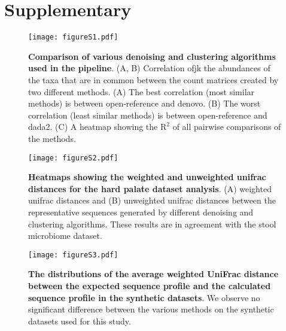 
\newpage
\section*{Supplementary}

  

  \renewcommand{\thefigure}{S\arabic{figure}}
  \setcounter{figure}{0}

  \begin{figure}[h]
  \centering
  \texttt{[image: figureS1.pdf]}
  \caption{
    \textbf{Comparison of various denoising and clustering algorithms used in the pipeline}.
    (A, B) Correlation ofjk the abundances of the taxa that are in common between the count matrices created by two different methods.
    (A) The best correlation (most similar methods) is between open-reference and denovo.
    (B) The worst correlation (least similar methods) is between open-reference and dada2.
    (C) A heatmap showing the $\mathrm{R}^2$ of all pairwise comparisons of the methods.
  }
  \label{fig:figureS1}
\end{figure}

  \begin{figure}[h]
    \centering
    \texttt{[image: figureS2.pdf]}
    \caption{
      \textbf{Heatmaps showing the weighted and unweighted unifrac distances for the hard palate dataset analysis}.
      (A) weighted unifrac distances and (B) unweighted unifrac distances between the representative sequences generated by different denoising and clustering algorithms.
      These results are in agreement with the stool microbiome dataset.
    }
    \label{fig:figureS2}
  \end{figure}

  \begin{figure}[h]
    \centering
    \texttt{[image: figureS3.pdf]}
    \caption{
      \textbf{The distributions of the average weighted UniFrac distance between the expected sequence profile and the calculated sequence profile in the synthetic datasets}.
      We observe no significant difference between the various methods on the synthetic datasets used for this study.
    }
    \label{fig:figureS3}
  \end{figure}


